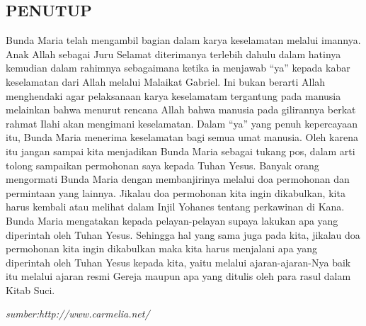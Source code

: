 \subsection*{PENUTUP}
Bunda Maria telah mengambil bagian dalam karya keselamatan melalui imannya. Anak Allah sebagai Juru Selamat diterimanya terlebih dahulu dalam hatinya kemudian dalam rahimnya sebagaimana ketika ia menjawab “ya” kepada kabar keselamatan dari Allah melalui Malaikat Gabriel. Ini bukan berarti Allah menghendaki agar pelaksanaan karya keselamatam tergantung pada manusia melainkan bahwa menurut rencana Allah bahwa manusia pada gilirannya berkat rahmat Ilahi akan mengimani keselamatan. Dalam “ya” yang penuh kepercayaan itu, Bunda Maria menerima keselamatan bagi semua umat manusia. Oleh karena itu jangan sampai kita menjadikan Bunda Maria sebagai tukang pos, dalam arti tolong sampaikan permohonan saya kepada Tuhan Yesus. Banyak orang mengormati Bunda Maria dengan membanjirinya melalui doa permohonan dan permintaan yang lainnya. Jikalau doa permohonan kita ingin dikabulkan, kita harus kembali atau melihat dalam Injil Yohanes tentang perkawinan di Kana. Bunda Maria mengatakan kepada pelayan-pelayan supaya lakukan apa yang diperintah oleh Tuhan Yesus. Sehingga hal yang sama juga pada kita, jikalau doa permohonan kita ingin dikabulkan maka kita harus menjalani apa yang diperintah oleh Tuhan Yesus kepada kita, yaitu melalui ajaran-ajaran-Nya baik itu melalui ajaran resmi Gereja maupun apa yang ditulis oleh para rasul dalam Kitab Suci.

\begin{flushright}\textit{sumber:http://www.carmelia.net/}\end{flushright}
